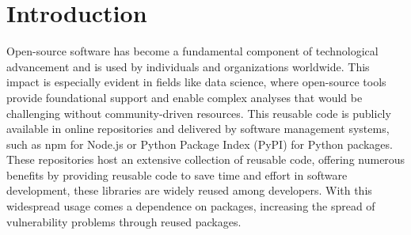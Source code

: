 \section{Introduction}
\label{1_introduction}

Open-source software has become a fundamental component of technological advancement and is used by individuals and organizations worldwide. This impact is especially evident in fields like data science, where open-source tools provide foundational support and enable complex analyses that would be challenging without community-driven resources. \cite{Malone2020Doing}
This reusable code is publicly available in online repositories and delivered by software management systems, such as npm for Node.js or Python Package Index (PyPI)\cite{PyPI} for Python packages. These repositories host an extensive collection of reusable code, offering numerous benefits by providing reusable code to save time and effort in software development, these libraries are widely reused among developers. 
\cite{DBLP:journals/corr/abs-1907-11073}
With this widespread usage comes a dependence on packages, increasing the spread of vulnerability problems through reused packages.

